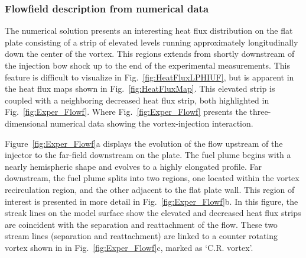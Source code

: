 \documentclass{AIAA}
\begin{document}
\subsubsection{Flowfield description from numerical data}

The numerical solution presents an interesting heat flux distribution on the flat plate consisting of a strip of elevated levels running approximately longitudinally down the center of the vortex.
This regions extends from shortly downstream of the injection bow shock up to the end of the experimental measurements.
This feature is difficult to visualize in Fig.~\ref{fig:HeatFluxLPHIUF}, but is apparent in the heat flux maps shown in Fig.~\ref{fig:HeatFluxMap}.
This elevated strip is coupled with a neighboring decreased heat flux strip, both highlighted in Fig.~\ref{fig:Exper_Flowf}.
Where Fig.~\ref{fig:Exper_Flowf} presents the three-dimensional numerical data showing the vortex-injection interaction. 


Figure~\ref{fig:Exper_Flowf}a displays the evolution of the flow upstream of the injector to the far-field downstream on the plate.
The fuel plume begins with a nearly hemispheric shape and evolves to a highly elongated profile. 
Far downstream, the fuel plume splits into two regions, one located within the vortex recirculation region, and the other adjacent to the flat plate wall.
This region of interest is presented in more detail in Fig.~\ref{fig:Exper_Flowf}b.
In this figure, the streak lines on the model surface show the elevated and decreased heat flux strips are coincident with the separation and reattachment of the flow.
These two stream lines (separation and reattachment) are linked to a counter rotating vortex shown in in Fig.~\ref{fig:Exper_Flowf}c, marked as `C.R. vortex'.
\end{document}
